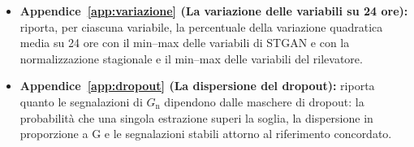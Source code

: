\begin{itemize}
    \item \textbf{Appendice~\ref{app:variazione} (La variazione delle variabili su 24 ore):} riporta, per ciascuna variabile, la percentuale della variazione quadratica media su 24 ore con il min--max delle variabili di STGAN e con la normalizzazione stagionale e il min--max delle variabili del rilevatore.
    \item \textbf{Appendice~\ref{app:dropout} (La dispersione del dropout):} riporta quanto le segnalazioni di $G_{\mathrm{n}}$ dipendono dalle maschere di dropout: la probabilità che una singola estrazione superi la soglia, la dispersione in proporzione a G e le segnalazioni stabili attorno al riferimento concordato.
\end{itemize}
